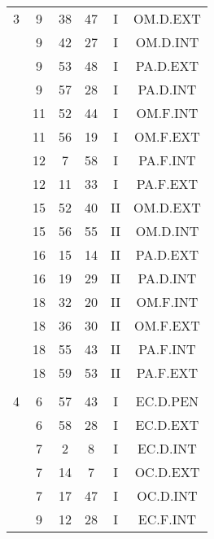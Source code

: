 \documentclass[12pt, a4paper]{article}
\begin{document}
\begin{multicols}{3}
{\begin{tabular}{c c c c c c}
	 	 	 	3 & 9 & 38 & 47 & I & OM.D.EXT\\%
	 	 	 	 & 9 & 42 & 27 & I & OM.D.INT\\%
	 	 	 	 & 9 & 53 & 48 & I & PA.D.EXT\\%
	 	 	 	 & 9 & 57 & 28 & I & PA.D.INT\\%
	 	 	 	 & 11 & 52 & 44 & I & OM.F.INT\\%
	 	 	 	 & 11 & 56 & 19 & I & OM.F.EXT\\%
	 	 	 	 & 12 & 7 & 58 & I & PA.F.INT\\%
	 	 	 	 & 12 & 11 & 33 & I & PA.F.EXT\\%
	 	 	 	 & 15 & 52 & 40 & II & OM.D.EXT\\%
	 	 	 	 & 15 & 56 & 55 & II & OM.D.INT\\%
	 	 	 	 & 16 & 15 & 14 & II & PA.D.EXT\\%
	 	 	 	 & 16 & 19 & 29 & II & PA.D.INT\\%
	 	 	 	 & 18 & 32 & 20 & II & OM.F.INT\\%
	 	 	 	 & 18 & 36 & 30 & II & OM.F.EXT\\%
	 	 	 	 & 18 & 55 & 43 & II & PA.F.INT\\%
	 	 	 	 & 18 & 59 & 53 & II & PA.F.EXT\\%
	 	 	 	 & & & & & \\%
	 	 	 	4 & 6 & 57 & 43 & I & EC.D.PEN\\%
	 	 	 	 & 6 & 58 & 28 & I & EC.D.EXT\\%
	 	 	 	 & 7 & 2 & 8 & I & EC.D.INT\\%
	 	 	 	 & 7 & 14 & 7 & I & OC.D.EXT\\%
	 	 	 	 & 7 & 17 & 47 & I & OC.D.INT\\%
	 	 	 	 & 9 & 12 & 28 & I & EC.F.INT\\%

\end{tabular}}
\end{multicols}
\end{document}
